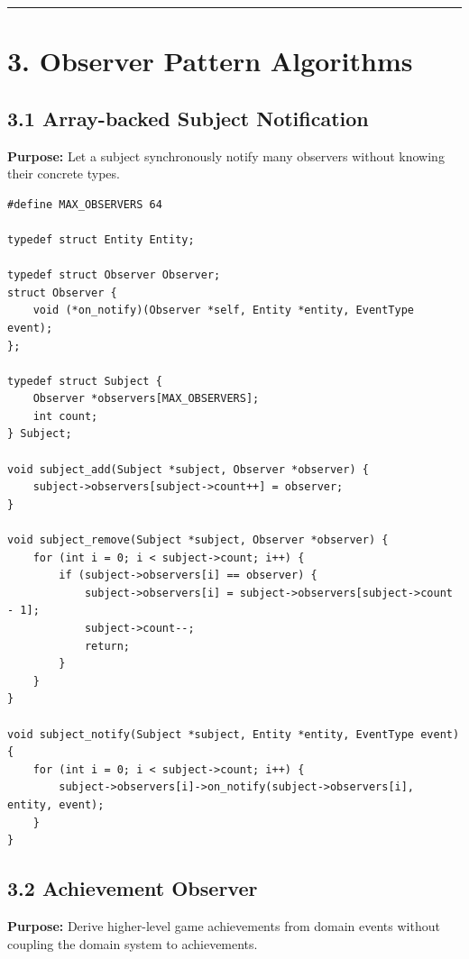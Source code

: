 \documentclass[10pt,letterpaper]{article}
\begin{document}
\medskip\hrule\medskip

\clearpage
\section{3. Observer Pattern Algorithms}

\subsection{3.1 Array-backed Subject Notification}

\textbf{Purpose:} Let a subject synchronously notify many observers without knowing their concrete types.

\begin{verbatim}
#define MAX_OBSERVERS 64

typedef struct Entity Entity;

typedef struct Observer Observer;
struct Observer {
    void (*on_notify)(Observer *self, Entity *entity, EventType event);
};

typedef struct Subject {
    Observer *observers[MAX_OBSERVERS];
    int count;
} Subject;

void subject_add(Subject *subject, Observer *observer) {
    subject->observers[subject->count++] = observer;
}

void subject_remove(Subject *subject, Observer *observer) {
    for (int i = 0; i < subject->count; i++) {
        if (subject->observers[i] == observer) {
            subject->observers[i] = subject->observers[subject->count - 1];
            subject->count--;
            return;
        }
    }
}

void subject_notify(Subject *subject, Entity *entity, EventType event) {
    for (int i = 0; i < subject->count; i++) {
        subject->observers[i]->on_notify(subject->observers[i], entity, event);
    }
}
\end{verbatim}

\subsection{3.2 Achievement Observer}

\textbf{Purpose:} Derive higher-level game achievements from domain events without coupling the domain system to achievements.
\end{document}
